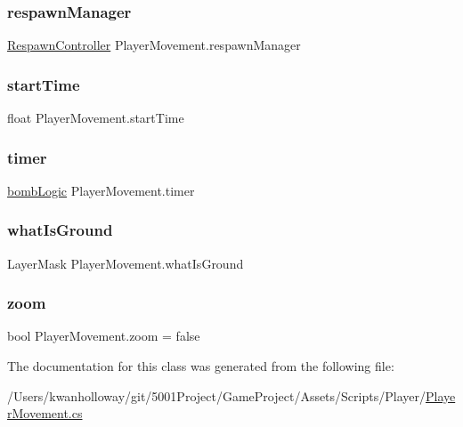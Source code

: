 \subsubsection{\texorpdfstring{respawn\+Manager}{respawnManager}}
{\footnotesize\ttfamily \hyperlink{class_respawn_controller}{Respawn\+Controller} Player\+Movement.\+respawn\+Manager}

\mbox{\label{class_player_movement_ae6959aebc17336198f7eb270f21e2195}} 
\subsubsection{\texorpdfstring{start\+Time}{startTime}}
{\footnotesize\ttfamily float Player\+Movement.\+start\+Time}

\mbox{\label{class_player_movement_a5ea646039fd085e5c19acef918f24a21}} 
\subsubsection{\texorpdfstring{timer}{timer}}
{\footnotesize\ttfamily \hyperlink{classbomb_logic}{bomb\+Logic} Player\+Movement.\+timer}

\mbox{\label{class_player_movement_a04b4dc5a83828e9fefcfe8acbf5de276}} 
\subsubsection{\texorpdfstring{what\+Is\+Ground}{whatIsGround}}
{\footnotesize\ttfamily Layer\+Mask Player\+Movement.\+what\+Is\+Ground}

\mbox{\label{class_player_movement_ae0fb74ddab994fb7627c7561629a8982}} 
\subsubsection{\texorpdfstring{zoom}{zoom}}
{\footnotesize\ttfamily bool Player\+Movement.\+zoom = false}



The documentation for this class was generated from the following file\+:\begin{DoxyCompactItemize}
\item 
/\+Users/kwanholloway/git/5001\+Project/\+Game\+Project/\+Assets/\+Scripts/\+Player/\hyperlink{_player_movement_8cs}{Player\+Movement.\+cs}\end{DoxyCompactItemize}
